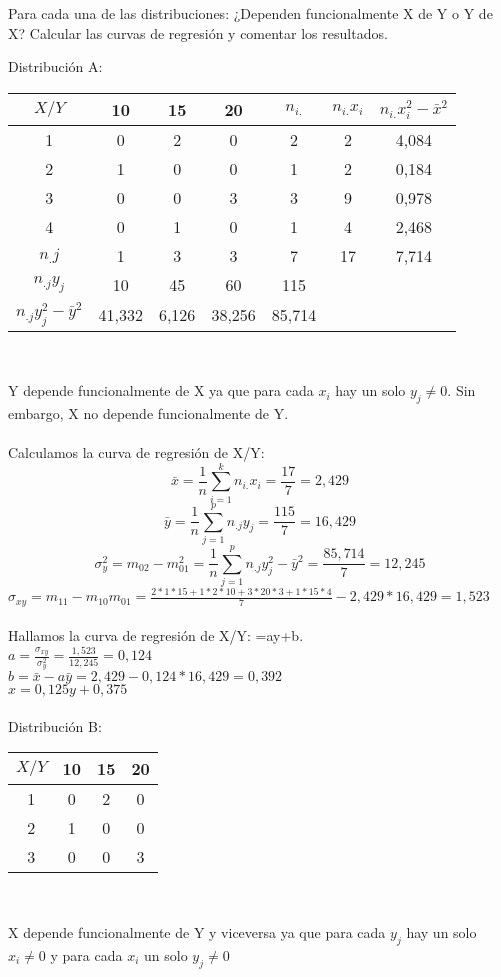 \problem
Para cada una de las distribuciones: ¿Dependen funcionalmente X de Y o Y de X? Calcular las curvas de regresión y comentar los resultados.

    Distribución A: 
    \begin{center}
    \begin{tabular}{| c | c | c | c | c | c | c |}
        \hline
        $X / Y$ & 10 & 15 & 20 & $n_{i.}$ & $n_{i.}x_i$ & $n_{i.}x_i^2 - \bar{x}^2$ \\ \hline
        1 & 0 & 2 & 0 & 2 & 2 & 4,084 \\
        2 & 1 & 0 & 0 & 1 & 2 & 0,184 \\
        3 & 0 & 0 & 3 & 3 & 9 & 0,978 \\
        4 & 0 & 1 & 0 & 1 & 4 & 2,468 \\
        $n_.j$ & 1 & 3 & 3 & 7 & 17 & 7,714\\  
        $n_{.j}y_j$ & 10 & 45 & 60 & 115 & & \\
        $n_{.j}y_j^2 - \bar{y}^2$ & 41,332 & 6,126 & 38,256 & 85,714 & & \\
        \hline
    \end{tabular} \\ 
    \end{center}
    Y depende funcionalmente de X ya que para cada $x_i$ hay un solo $y_j\neq 0$. Sin embargo, X no depende funcionalmente de Y. \\ \\
    Calculamos la curva de regresión de X/Y: 
    \[\bar{x} = \frac{1}{n}\sum_{i=1}^{k}n_{i.}x_i = \frac{17}{7} = 2,429 \]
    \[\bar{y} = \frac{1}{n}\sum_{j=1}^{p}n_{.j}y_j = \frac{115}{7} = 16,429 \]
    \[\sigma_y^2 = m_{02}-m_{01}^2 = \frac{1}{n}\sum_{j=1}^{p}n_{.j}y_j^2-\bar{y}^2 = \frac{85,714}{7} = 12,245\]
    $\sigma_{xy} = m_{11}-m_{10}m_{01} = \frac{2*1*15+1*2*10+3*20*3+1*15*4}{7} - 2,429*16,429 = 1,523$ \\ \\
    Hallamos la curva de regresión de X/Y: =ay+b. \\
    $a = \frac{\sigma_{xy}}{\sigma_y^2} = \frac{1,523}{12,245} = 0,124$ \\
    $b = \bar{x}-a\bar{y} = 2,429 - 0,124*16,429 = 0,392$ \\
    $x=0,125y + 0,375$ \\ \\ 
    
    Distribución B: 
    \begin{center}
    \begin{tabular}{| c | c | c | c |}
        \hline
        $X / Y$ & 10 & 15 & 20 \\ \hline
        1 & 0 & 2 & 0 \\
        2 & 1 & 0 & 0 \\
        3 & 0 & 0 & 3 \\
        \hline
    \end{tabular} \\ 
    \end{center}
    X depende funcionalmente de Y y viceversa ya que para cada $y_j$ hay un solo $x_i\neq 0$ y para cada $x_i$ un solo $y_j\neq 0$ \\ \\
    
